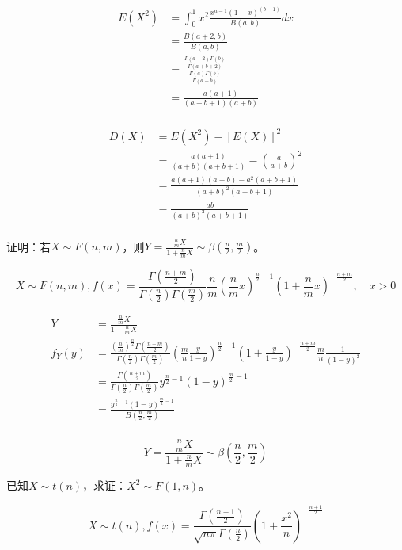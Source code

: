  \[
    \begin{split}
      E(X^2) &= \int_0^1 x^2 \frac{x^{a-1} (1-x)^(b-1)}{B(a, b)}dx\\
      &= \frac{B(a+2, b)}{B(a, b)}\\
      &= \frac{\frac{\Gamma (a+2) \Gamma (b)}{\Gamma (a+b+2)}}{\frac{\Gamma (a) \Gamma (b)}{\Gamma (a+b)}}\\
      &= \frac{a(a+1)}{(a+b+1)(a+b)}\\
    \end{split}
  \]

  \[
    \begin{split}
      D(X) &= E(X^2) - [E(X)]^2\\
      &= \frac{a(a+1)}{(a+b)(a+b+1)} - (\frac{a}{a+b})^2\\
      &= \frac{a(a+1)(a+b) - a^2(a+b+1)}{(a+b)^2 (a+b+1)}\\
      &= \frac{ab}{(a+b)^2(a+b+1)}\\
    \end{split}
  \]


   证明：若$X \sim F(n, m)$，则$Y = \frac{\frac{n}{m} X}{1+\frac{n}{m} X} \sim \beta (\frac{n}{2}, \frac{m}{2})$。

  \xsv
  \[
    X \sim F(n, m),
    f(x) = \frac{\Gamma (\frac{n+m}{2})}{\Gamma (\frac{n}{2}) \Gamma (\frac{m}{2})} \frac{n}{m} (\frac{n}{m} x)^{\frac{n}{2} - 1} (1+\frac{n}{m} x)^{-\frac{n+m}{2}}, \quad x>0
  \]

  \[
    \begin{split}
      Y &= \frac{\frac{n}{m} X}{1+\frac{n}{m} X}\\
      f_Y (y) &= \frac{(\frac{n}{m})^{\frac{n}{2}} \Gamma (\frac{n+m}{2})}{\Gamma (\frac{n}{2}) \Gamma (\frac{m}{2})} (\frac{m}{n} \frac{y}{1-y})^{\frac{n}{2} - 1} (1+\frac{y}{1-y})^{-\frac{n+m}{2}} \frac{m}{n} \frac{1}{(1-y)^2}\\
      &= \frac{\Gamma (\frac{n+m}{2})}{\Gamma (\frac{n}{2}) \Gamma (\frac{m}{2})} y^{\frac{n}{2} - 1} (1-y)^{\frac{m}{2} - 1}\\
      &= \frac{y^{\frac{n}{2} - 1} (1-y)^{\frac{m}{2} - 1}}{B(\frac{n}{2}, \frac{m}{2})}\\
    \end{split}
  \]

  $$Y = \frac{\frac{n}{m} X}{1+\frac{n}{m} X} \sim \beta (\frac{n}{2}, \frac{m}{2})$$

   已知$X \sim t(n)$，求证：$X^2 \sim F(1, n)$。

  \xsv
  \[
    X \sim t(n),
    f(x) = \frac{\Gamma (\frac{n+1}{2})}{\sqrt{n\pi} \Gamma (\frac{n}{2})} (1+\frac{x^2}{n})^{-\frac{n+1}{2}}
  \]

